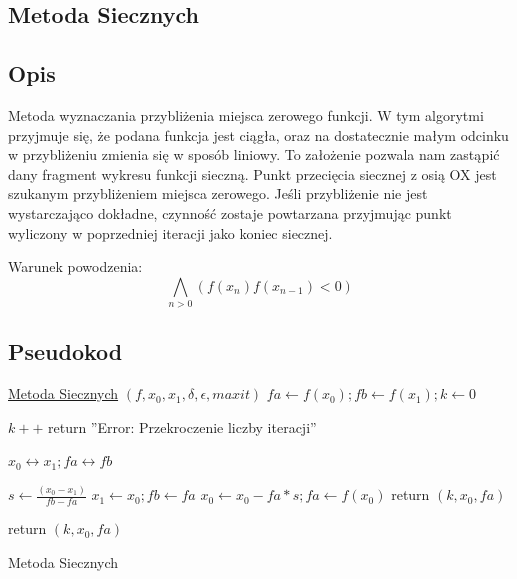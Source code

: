 \documentclass[11pt, a4paper]{article}
\begin{document}
    \subsection{Metoda Siecznych}
    \subsection{Opis}
    Metoda wyznaczania przybliżenia miejsca zerowego funkcji. W tym algorytmi przyjmuje się, że podana funkcja jest ciągła, oraz na dostatecznie małym odcinku w przybliżeniu zmienia się w sposób liniowy. To założenie pozwala nam zastąpić dany fragment wykresu funkcji sieczną. Punkt przecięcia siecznej z osią OX jest szukanym przybliżeniem miejsca zerowego. Jeśli przybliżenie nie jest wystarczająco dokładne, czynność zostaje powtarzana przyjmując punkt wyliczony w poprzedniej iteracji jako koniec siecznej.
    
    Warunek powodzenia:\\
    
    $$\bigwedge_{n>0} (f(x_{n})f(x_{n-1}) < 0) $$
    
    \subsection{Pseudokod}
    \begin{algorithm}[H]

        \underline{Metoda Siecznych} $(f, x_{0},x_{1}, \delta,\epsilon, maxit)$\;
        $fa \leftarrow f(x_{0}); fb \leftarrow f(x_{1}); k \leftarrow 0$\;
        {
            $k++$\;
            {
                return ''Error: Przekroczenie liczby iteracji''\;
            }

            {
                $x_{0} \leftrightarrow x_{1}; fa \leftrightarrow fb$\;
            }

            $s \leftarrow \frac{(x_{0} - x_{1})}{fb - fa}$\;
            $x_{1} \leftarrow x_{0}; fb \leftarrow fa$\;
            $x_{0} \leftarrow x_{0} - fa*s; fa \leftarrow f(x_{0})$\;
            {
                return $(k, x_{0}, fa)$\;
            }
        }
        return $(k, x_{0}, fa)$\;
        \caption{Metoda Siecznych}
    \end{algorithm}
\end{document}
